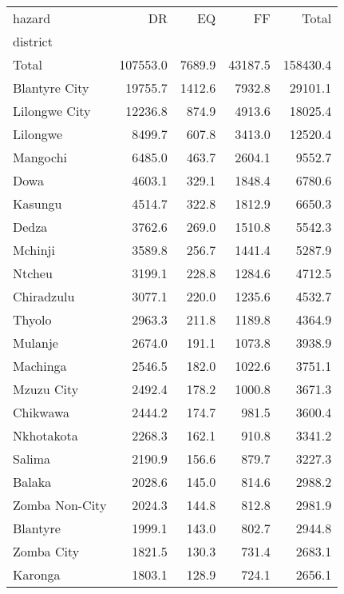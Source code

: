 \begin{tabular}{lrrrr}
\toprule
hazard &        DR &      EQ &       FF &     Total \\
district       &           &         &          &           \\
\midrule
Total          &  107553.0 &  7689.9 &  43187.5 &  158430.4 \\
Blantyre City  &   19755.7 &  1412.6 &   7932.8 &   29101.1 \\
Lilongwe City  &   12236.8 &   874.9 &   4913.6 &   18025.4 \\
Lilongwe       &    8499.7 &   607.8 &   3413.0 &   12520.4 \\
Mangochi       &    6485.0 &   463.7 &   2604.1 &    9552.7 \\
Dowa           &    4603.1 &   329.1 &   1848.4 &    6780.6 \\
Kasungu        &    4514.7 &   322.8 &   1812.9 &    6650.3 \\
Dedza          &    3762.6 &   269.0 &   1510.8 &    5542.3 \\
Mchinji        &    3589.8 &   256.7 &   1441.4 &    5287.9 \\
Ntcheu         &    3199.1 &   228.8 &   1284.6 &    4712.5 \\
Chiradzulu     &    3077.1 &   220.0 &   1235.6 &    4532.7 \\
Thyolo         &    2963.3 &   211.8 &   1189.8 &    4364.9 \\
Mulanje        &    2674.0 &   191.1 &   1073.8 &    3938.9 \\
Machinga       &    2546.5 &   182.0 &   1022.6 &    3751.1 \\
Mzuzu City     &    2492.4 &   178.2 &   1000.8 &    3671.3 \\
Chikwawa       &    2444.2 &   174.7 &    981.5 &    3600.4 \\
Nkhotakota     &    2268.3 &   162.1 &    910.8 &    3341.2 \\
Salima         &    2190.9 &   156.6 &    879.7 &    3227.3 \\
Balaka         &    2028.6 &   145.0 &    814.6 &    2988.2 \\
Zomba Non-City &    2024.3 &   144.8 &    812.8 &    2981.9 \\
Blantyre       &    1999.1 &   143.0 &    802.7 &    2944.8 \\
Zomba City     &    1821.5 &   130.3 &    731.4 &    2683.1 \\
Karonga        &    1803.1 &   128.9 &    724.1 &    2656.1 \\

\end{tabular}
